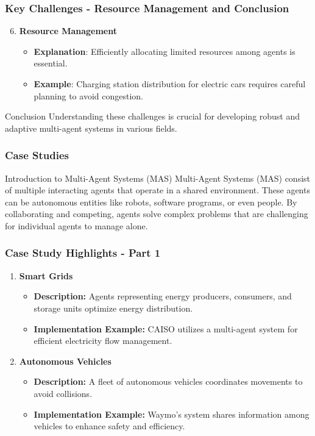 \documentclass[aspectratio=169]{beamer}
\begin{document}
\begin{frame}[fragile]
    \frametitle{Key Challenges - Resource Management and Conclusion}
    \begin{enumerate}
        \setcounter{enumi}{5}
        \item \textbf{Resource Management}
            \begin{itemize}
                \item \textbf{Explanation}: Efficiently allocating limited resources among agents is essential.
                \item \textbf{Example}: Charging station distribution for electric cars requires careful planning to avoid congestion.
            \end{itemize}
    \end{enumerate}
    \begin{block}{Conclusion}
        Understanding these challenges is crucial for developing robust and adaptive multi-agent systems in various fields.
    \end{block}
\end{frame}

\begin{frame}[fragile]
    \frametitle{Case Studies}
    \begin{block}{Introduction to Multi-Agent Systems (MAS)}
        Multi-Agent Systems (MAS) consist of multiple interacting agents that operate in a shared environment. These agents can be autonomous entities like robots, software programs, or even people. By collaborating and competing, agents solve complex problems that are challenging for individual agents to manage alone.
    \end{block}
\end{frame}

\begin{frame}[fragile]
    \frametitle{Case Study Highlights - Part 1}
    \begin{enumerate}
        \item \textbf{Smart Grids}
        \begin{itemize}
            \item \textbf{Description:} Agents representing energy producers, consumers, and storage units optimize energy distribution.
            \item \textbf{Implementation Example:} CAISO utilizes a multi-agent system for efficient electricity flow management.
        \end{itemize}

        \item \textbf{Autonomous Vehicles}
        \begin{itemize}
            \item \textbf{Description:} A fleet of autonomous vehicles coordinates movements to avoid collisions.
            \item \textbf{Implementation Example:} Waymo's system shares information among vehicles to enhance safety and efficiency.
        \end{itemize}
    \end{enumerate}
\end{frame}
\end{document}
